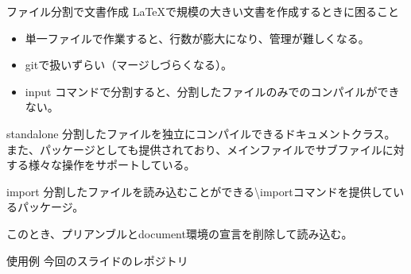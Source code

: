 \documentclass[dvipdfmx,12pt,beamer]{standalone}
\begin{document}
\begin{frame}[fragile]{ファイル分割で文書作成}
	\LaTeX で規模の大きい文書を作成するときに困ること
	\begin{itemize}
		\item 単一ファイルで作業すると、行数が膨大になり、管理が難しくなる。
		\item gitで扱いずらい（マージしづらくなる）。
		\item \textwidth input コマンドで分割すると、分割したファイルのみでのコンパイルができない。
	\end{itemize}

	\begin{block}{standalone}
		分割したファイルを独立にコンパイルできるドキュメントクラス。
		また、パッケージとしても提供されており、メインファイルでサブファイルに対する様々な操作をサポートしている。
	\end{block}
	\begin{block}{import}
		分割したファイルを読み込むことができる\textbackslash importコマンドを提供しているパッケージ。

		このとき、プリアンブルとdocument環境の宣言を削除して読み込む。
	\end{block}
\end{frame}

\begin{frame}{使用例}
	今回のスライドのレポジトリ

	\url{ }
\end{frame}
\end{document}
